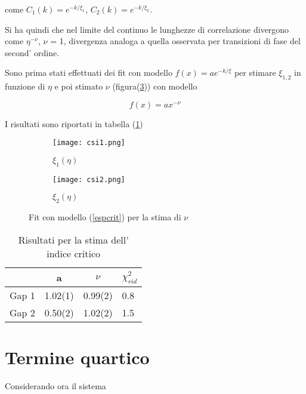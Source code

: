 \documentclass{article}
\begin{document}
come $C_1(k) = e^{-k/\xi_1}$, $C_2(k) = e^{-k/\xi_2}$. 

Si ha quindi che nel limite del continuo le lunghezze di correlazione divergono come $\eta^{-\nu}$, $\nu$ = 1, divergenza analoga a quella osservata per transizioni di fase del second' ordine.

Sono prima stati effettuati dei fit con modello $f(x) = ae^{-k/\xi}$ per stimare $\xi_{1,2}$ in funzione di $\eta$ e poi stimato $\nu$ (figura(\ref{fig:csi12})) con modello 

\begin{equation}
    f(x) = ax^{-\nu}
    \label{espcrit}
\end{equation}

I risultati sono riportati in tabella (\ref{tabindice})

\begin{figure}[h]
     \centering
     \begin{subfigure}[b]{0.48\textwidth}
         \centering
         \texttt{[image: csi1.png]}
         \caption{$\xi_1(\eta)$}
         \label{fig:csi1fig}
     \end{subfigure}
     \hfill
     \begin{subfigure}[b]{0.48\textwidth}
         \centering
         \texttt{[image: csi2.png]}
         \caption{$\xi_2(\eta)$}
         \label{fig:csi2fig}
     \end{subfigure}
     \hfill
        \caption{Fit con modello (\ref{espcrit}) per la stima di $\nu$}
        \label{fig:csi12}
\end{figure}

\begin{table}[h]
\centering
\begin{tabular}{lccl}
      & a       & $\nu$   & $\chi^2_{rid}$ \\ \hline\hline
Gap 1 & 1.02(1) & 0.99(2) & 0.8            \\
Gap 2 & 0.50(2) & 1.02(2) & 1.5           
\end{tabular}
\caption{Risultati per la stima dell' indice critico}
\label{tabindice}
\end{table}

\newpage

\section{Termine quartico}

Considerando ora il sistema
\end{document}
